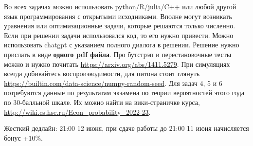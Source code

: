 \documentclass[12pt]{article} %
\begin{document}
Во всех задачах можно использовать python/R/julia/C++ или любой другой язык программирования с открытыми исходниками. 
Вполне могут возникать уравнения или оптимизационные задачи, которые решаются только численно.
Если при решении задачи использовался код, то его нужно привести. 
Можно использовать chatgpt с указанием полного диалога в решении.  
Решение нужно прислать в виде \textbf{одного pdf файла}. 
Про бутстрэп и перестановочные тесты можно и нужно почитать \url{https://arxiv.org/abs/1411.5279}.
При симуляциях всегда добивайтесь воспроизводимости, для питона стоит глянуть \url{https://builtin.com/data-science/numpy-random-seed}.
Для задач 4, 5 и 6 потребуются данные по результатам экзамена по теории вероятностей этого года 
по 30-балльной шкале. Их можно найти на вики-страничке курса, \url{http://wiki.cs.hse.ru/Econ_probability_2022-23}. 

Жесткий дедлайн: 21:00 12 июня, 
при сдаче работы до 21:00 11 июня начисляется бонус +10\%.  
\end{document}
